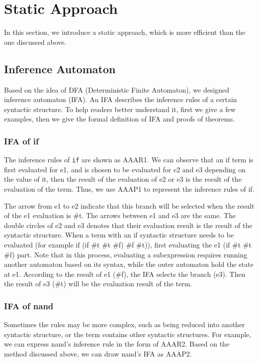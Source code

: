 \section{Static Approach}

In this section, we introduce a static approach, which is more efficient than the one discussed above.


\subsection{Inference Automaton}

Based on the idea of DFA (Deterministic Finite Automaton), we designed inference automaton (IFA). An IFA describes the inference rules of a certain syntactic structure. To help readers better understand it, first we give a few examples, then we give the formal definition of IFA and proofs of theorems.

\subsubsection{IFA of if}

The inference rules of \texttt{if} are shown as AAAR1. We can observe that an if term is first evaluated for e1, and is chosen to be evaluated for e2 and e3 depending on the value of it, then the result of the evaluation of e2 or e3 is the result of the evaluation of the term. Thus, we use AAAP1 to represent the inference rules of if.

The arrow from e1 to e2 indicate that this branch will be selected when the result of the e1 evaluation is \#t. The arrows between e1 and e3 are the same. The double circles of e2 and e3 denotes that their evaluation result is the result of the syntactic structure. When a term with an if syntactic structure needs to be evaluated (for example if (if \#t \#t \#f) \#f \#t)), first evaluating the e1 (if \#t \#t \#f) part. Note that in this process, evaluating a subexpression requires running another automaton based on its syntax, while the outer automaton hold the state at e1. According to the result of e1 (\#f), the IFA selects the branch (e3). Then the result of e3 (\#t) will be the evaluation result of the term.

\subsubsection{IFA of nand}

Sometimes the rules may be more complex, such as being reduced into another syntactic structure, or the term contains other syntactic structures. For example, we can express nand's inference rule in the form of AAAR2. Based on the method discussed above, we can draw nand's IFA as AAAP2.

